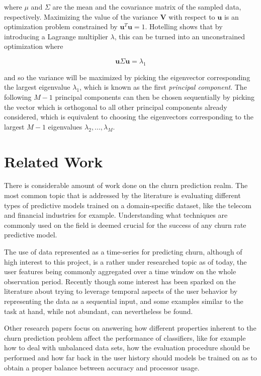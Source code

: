 \documentclass{kththesis}
\begin{document}
where $\mu$ and $\Sigma$ are the mean and the covariance matrix of the sampled data, respectively. Maximizing the value of the variance $\mathbf{V}$ with respect to $\mathbf{u}$ is an optimization problem constrained by $\mathbf{u}^T \mathbf{u}=1$. Hotelling\citep{hotelling1933analysis} shows that by introducing a Lagrange multiplier $\lambda$, this can be turned into an unconstrained optimization where

\begin{equation}
\mathbf{u}\Sigma\mathbf{u} = \lambda_1
\end{equation}
	
and so the variance will be maximized by picking the eigenvector corresponding the largest eigenvalue $\lambda_1$, which is known as the first \emph{principal component}. The following $M-1$ principal components can then be chosen sequentially by picking the vector which is orthogonal to all other principal components already considered, which is equivalent to choosing the eigenvectors corresponding to the largest $M-1$ eigenvalues $\lambda_2,..., \lambda_M$.

\chapter{Related Work}
\label{cha:related_work}

There is considerable amount of work done on the churn prediction realm. The most common topic that is addressed by the literature is evaluating different types of predictive models trained on a domain-specific dataset, like the telecom and financial industries for example. Understanding what techniques are commonly used on the field is deemed crucial for the success of any churn rate predictive model.

The use of data represented as a time-series for predicting churn, although of high interest to this project, is a rather under researched topic as of today, the user features being commonly aggregated over a time window on the whole observation period. Recently though some interest has been sparked on the literature about trying to leverage temporal aspects of the user behavior by representing the data as a sequential input, and some examples similar to the task at hand, while not abundant, can nevertheless be found. 

Other research papers focus on answering how different properties inherent to the churn prediction problem affect the performance of classifiers, like for example how to deal with unbalanced data sets, how the evaluation procedure should be performed and how far back in the user history should models be trained on as to obtain a proper balance between accuracy and processor usage.  
\end{document}
